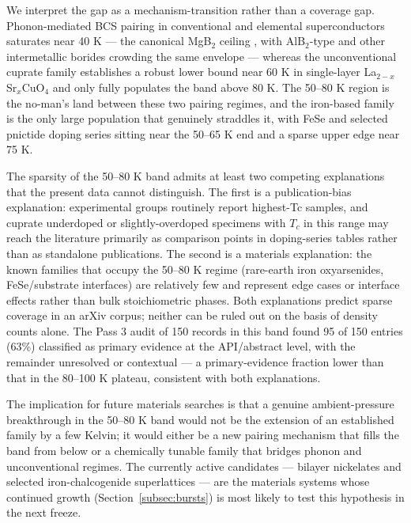 \documentclass[11pt]{article}
\begin{document}
We interpret the gap as a mechanism-transition rather than a coverage gap. Phonon-mediated BCS pairing in conventional and elemental superconductors saturates near 40 K --- the canonical MgB$_2$ ceiling \cite{nagamatsu2001mgb2}, with AlB$_2$-type and other intermetallic borides crowding the same envelope --- whereas the unconventional cuprate family establishes a robust lower bound near 60 K in single-layer La$_{2-x}$Sr$_x$CuO$_4$ \cite{keimer2015cupratereview} and only fully populates the band above 80 K. The 50--80 K region is the no-man's land between these two pairing regimes, and the iron-based family is the only large population that genuinely straddles it, with FeSe and selected pnictide doping series \cite{stewart2011ironpnictidesreview,hosono2015ironreview} sitting near the 50--65 K end and a sparse upper edge near 75 K.

The sparsity of the 50--80 K band admits at least two competing explanations that the present data cannot distinguish. The first is a publication-bias explanation: experimental groups routinely report highest-Tc samples, and cuprate underdoped or slightly-overdoped specimens with $T_c$ in this range may reach the literature primarily as comparison points in doping-series tables rather than as standalone publications. The second is a materials explanation: the known families that occupy the 50--80 K regime (rare-earth iron oxyarsenides, FeSe/substrate interfaces) are relatively few and represent edge cases or interface effects rather than bulk stoichiometric phases. Both explanations predict sparse coverage in an arXiv corpus; neither can be ruled out on the basis of density counts alone. The Pass 3 audit of 150 records in this band found 95 of 150 entries (63\%) classified as primary evidence at the API/abstract level, with the remainder unresolved or contextual --- a primary-evidence fraction lower than that in the 80--100 K plateau, consistent with both explanations.

The implication for future materials searches is that a genuine ambient-pressure breakthrough in the 50--80 K band would not be the extension of an established family by a few Kelvin; it would either be a new pairing mechanism that fills the band from below or a chemically tunable family that bridges phonon and unconventional regimes. The currently active candidates --- bilayer nickelates and selected iron-chalcogenide superlattices --- are the materials systems whose continued growth (Section~\ref{subsec:bursts}) is most likely to test this hypothesis in the next freeze.
\end{document}
